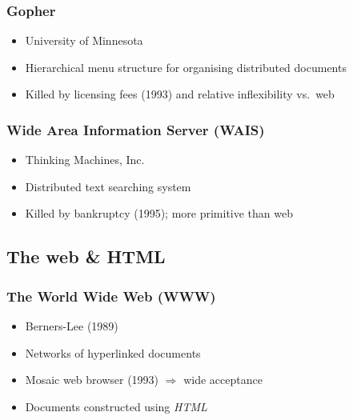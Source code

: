


\frame
{
	\frametitle{Gopher}
	
	\begin{itemize}
	
		\item University of Minnesota
		
		\item Hierarchical menu structure for organising distributed
		documents
		
		\item Killed by licensing fees (1993) and relative inflexibility
		vs.\ web
	
	\end{itemize}

}

\usebackgroundtemplate{}




\frame
{
	\frametitle{Wide Area Information Server (WAIS)}
	
	\begin{itemize}
	
		\item Thinking Machines, Inc.
		
		\item Distributed text searching system
		
		\item Killed by bankruptcy (1995); more primitive than web
	
	\end{itemize}

}




\subsection*{The web \& HTML}




\frame
{
	\frametitle{The World Wide Web (WWW)}
	
	\begin{itemize}
	
		\item Berners-Lee (1989)
		
		\item Networks of hyperlinked documents
		
		
		\item Mosaic web browser (1993) \(\Rightarrow\) wide acceptance
		
		\item Documents constructed using \emph{HTML}
	
	\end{itemize}

}


